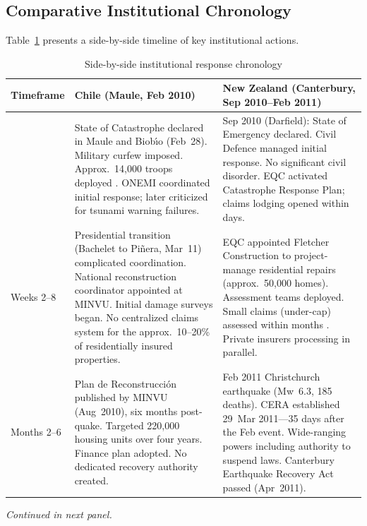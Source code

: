 \documentclass[12pt]{article}
\begin{document}
\subsection{Comparative Institutional Chronology}

Table~\ref{tab:chronology} presents a side-by-side timeline of key institutional actions.

\begin{table}[!htbp]
\centering
\caption{Side-by-side institutional response chronology}
\label{tab:chronology}
\footnotesize
\begin{tabular}{@{}
  >{\raggedright\arraybackslash}p{}
  >{\raggedright\arraybackslash}p{}
  >{\raggedright\arraybackslash}p{}
@{}}
\toprule
\textbf{Timeframe} &
\textbf{Chile (Maule, Feb 2010)} &
\textbf{New Zealand (Canterbury, Sep 2010--Feb 2011)} \\
\midrule

{Days 1--7} &
State of Catastrophe declared in Maule and Biob{\'{\i}}o (Feb~28). Military curfew imposed. Approx.\ 14,000 troops deployed \parencite{CRS2010}. ONEMI coordinated initial response; later criticized for tsunami warning failures. &
Sep 2010 (Darfield): State of Emergency declared. Civil Defence managed initial response. No significant civil disorder. EQC activated Catastrophe Response Plan; claims lodging opened within days. \\
\addlinespace

{Weeks 2--8} &
Presidential transition (Bachelet to Pi{\~n}era, Mar~11) complicated coordination. National reconstruction coordinator appointed at MINVU. Initial damage surveys began. No centralized claims system for the approx.\ 10--20\% of residentially insured properties. &
EQC appointed Fletcher Construction to project-manage residential repairs (approx.\ 50,000 homes). Assessment teams deployed. Small claims (under-cap) assessed within months \parencite{Khakurel2021}. Private insurers processing in parallel. \\
\addlinespace

{Months 2--6} &
Plan de Reconstrucci{\'o}n published by MINVU (Aug~2010), six months post-quake. Targeted 220,000 housing units over four years. Finance plan adopted. No dedicated recovery authority created. &
Feb 2011 Christchurch earthquake (Mw~6.3, 185 deaths). CERA established 29~Mar 2011---35 days after the Feb event. Wide-ranging powers including authority to suspend laws. Canterbury Earthquake Recovery Act passed (Apr~2011). \\

\bottomrule
\end{tabular}

\vspace{2pt}
{\scriptsize\textit{Continued in next panel.}}
\end{table}
\end{document}

